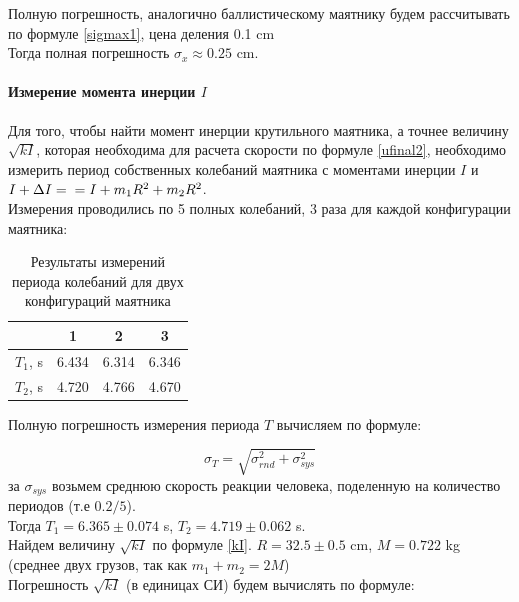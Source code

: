 \documentclass[a4paper,12pt]{article}
\begin{document}
	Полную погрешность, аналогично баллистическому маятнику будем рассчитывать по формуле \eqref{sigmax1}, цена деления 0.1 cm\\
	
	Тогда полная погрешность $\sigma_x\approx0.25$ cm.\\
	
	\paragraph{Измерение момента инерции $I$}
	Для того, чтобы найти момент инерции крутильного маятника, а точнее величину $\sqrt{kI}$, которая необходима для расчета скорости по формуле \eqref{ufinal2}, необходимо измерить период собственных колебаний маятника с моментами инерции $I$ и $I+\Delta I= \newline=I+m_1R^2+m_2R^2$.\\
	
	Измерения проводились по 5 полных колебаний, 3 раза для каждой конфигурации маятника:
	
	\begin{table}[H]
		\centering
		\begin{tabular}{|c|c|c|c|}
			\hline
			& 1 & 2 & 3\\
			\hline
			$T_1$, s & 6.434 & 6.314 & 6.346 \\
			\hline
			$T_2$, s & 4.720 & 4.766 & 4.670 \\
			\hline
		\end{tabular}
		\caption{Результаты измерений периода колебаний для двух конфигураций маятника}
	\end{table}
	
	Полную погрешность измерения периода $T$ вычисляем по формуле:
	
	\begin{equation}
		\label{sigmaT}
		\sigma_T=\sqrt{\sigma_{rnd}^2+\sigma_{sys}^2}
	\end{equation}
	за $\sigma_{sys}$ возьмем среднюю скорость реакции человека, поделенную на количество периодов (т.е $0.2/5$).\\
	
	Тогда $T_1=6.365\pm0.074$ s, $T_2=4.719\pm0.062$ s.\\
	
	Найдем величину $\sqrt{kI}$ по формуле \eqref{kI}. $R=32.5\pm0.5$ cm, $M=0.722$ kg (среднее двух грузов, так как $m_1+m_2=2M$)\\
	
	Погрешность $\sqrt{kI}$ (в единицах СИ) будем вычислять по формуле:
	
\end{document}
